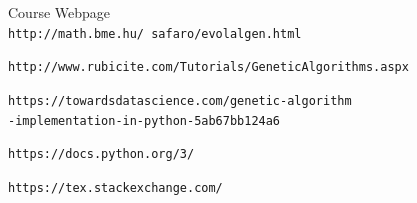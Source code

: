 \documentclass[12pt,english]{article}
\begin{document}
\begin{thebibliography}{9}

Course Webpage
\\\texttt{http://math.bme.hu/~safaro/evolalgen.html}

\texttt{http://www.rubicite.com/Tutorials/GeneticAlgorithms.aspx}

\texttt{https://towardsdatascience.com/genetic-algorithm\\
-implementation-in-python-5ab67bb124a6}

\texttt{https://docs.python.org/3/}


\texttt{https://tex.stackexchange.com/}

\end{thebibliography}
\end{document}
